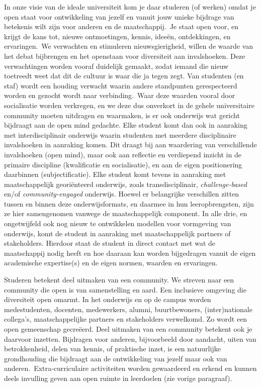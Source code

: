 \documentclass[smallauthor, chapterhaspagenum, nochapterinheader, pagenuminheader,  bigchapnum,medium2, tocpages, garamond, titleinheader]{jote-book}
\begin{document}
	In onze visie van de ideale universiteit kom je daar studeren (of werken) omdat je open staat voor ontwikkeling van jezelf en vanuit jouw unieke bijdrage van betekenis wilt zijn voor anderen en de maatschappij. Je staat open voor, en krijgt de kans tot, nieuwe ontmoetingen, kennis, ideeën, ontdekkingen, en ervaringen. We verwachten en stimuleren nieuwsgierigheid, willen de waarde van het debat bijbrengen en het openstaan voor diversiteit aan invalshoeken. Deze verwachtingen worden vooraf duidelijk gemaakt, zodat iemand die nieuw toetreedt weet dat dit de cultuur is waar die ja tegen zegt. Van studenten (en staf) wordt een houding verwacht waarin andere standpunten gerespecteerd worden en gezocht wordt naar verbinding. Waar deze waarden vooral door socialisatie worden verkregen, en we deze dus onverkort in de gehele universitaire community moeten uitdragen en waarmaken, is er ook onderwijs wat gericht bijdraagt aan de open mind gedachte. Elke student komt dan ook in aanraking met interdisciplinair onderwijs waarin studenten met meerdere disciplinaire invalshoeken in aanraking komen. Dit draagt bij aan waardering van verschillende invalshoeken (open mind), maar ook aan reflectie en verdiepend inzicht in de primaire discipline (kwalificatie en socialisatie), en aan de eigen positionering daarbinnen (subjectificatie). Elke student komt tevens in aanraking met maatschappelijk georiënteerd onderwijs, zoals transdisciplinair, \emph{c}\emph{hallenge}\emph{-b}\emph{ased} en/of \emph{c}\emph{ommunity}\emph{-e}\emph{ngaged} onderwijs. Hoewel er belangrijke verschillen zitten tussen en binnen deze onderwijsformats, en daarmee in hun leeropbrengsten, zijn ze hier samengenomen vanwege de maatschappelijk component. In alle drie, en ongetwijfeld ook nog nieuw te ontwikkelen modellen voor vormgeving van onderwijs, komt de student in aanraking met maatschappelijk partners of stakeholders. Hierdoor staat de student in direct contact met wat de maatschappij nodig heeft en hoe daaraan kan worden bijgedragen vanuit de eigen academische expertise(s) en de eigen normen, waarden en ervaringen.



	Studeren betekent deel uitmaken van een community. We streven naar een community die open is van samenstelling en aard. Een inclusieve omgeving die diversiteit open omarmt. In het onderwijs en op de campus worden medestudenten, docenten, medewerkers, alumni, buurtbewoners, (inter)nationale collega's, maatschappelijke partners en stakeholders verwelkomd. Zo wordt een open gemeenschap gecreëerd. Deel uitmaken van een community betekent ook je daarvoor inzetten. Bijdragen voor anderen, bijvoorbeeld door aandacht, uiten van betrokkenheid, delen van kennis, of praktische inzet, is een natuurlijke grondhouding die bijdraagt aan de ontwikkeling van jezelf maar ook van anderen. Extra-curriculaire activiteiten worden gewaardeerd en erkend en kunnen deels invulling geven aan open ruimte in leerdoelen (zie vorige paragraaf).
\end{document}
